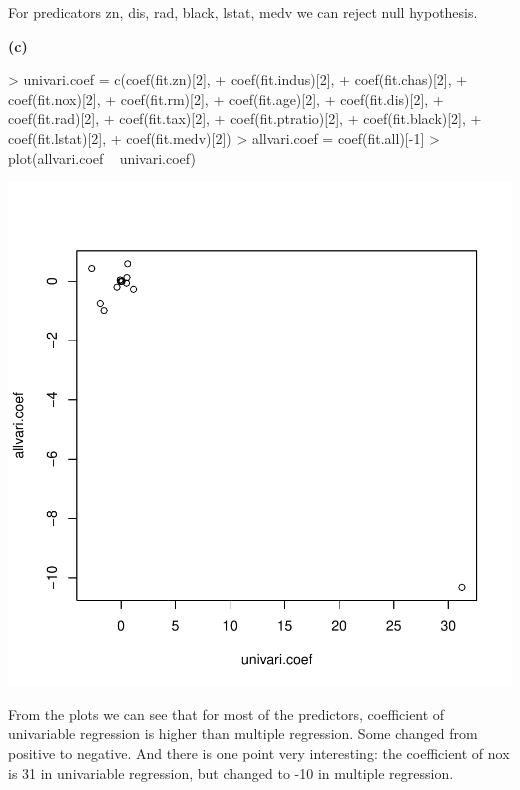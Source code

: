 \documentclass[a4paper]{article}
\renewcommand{\part}[1] {\vspace{.10in} {\bf (#1)}}
\begin{document}
\begin{enumerate}
{\color{red}
\item For predicators zn, dis, rad, black, lstat, medv we can reject null hypothesis.
}
\end{enumerate}

\part{c}
\begin{Schunk}
\begin{Sinput}
> univari.coef = c(coef(fit.zn)[2],
+                  coef(fit.indus)[2],
+                  coef(fit.chas)[2],
+                  coef(fit.nox)[2],
+                  coef(fit.rm)[2],
+                  coef(fit.age)[2],
+                  coef(fit.dis)[2],
+                  coef(fit.rad)[2],
+                  coef(fit.tax)[2],
+                  coef(fit.ptratio)[2],
+                  coef(fit.black)[2],
+                  coef(fit.lstat)[2],
+                  coef(fit.medv)[2])
> allvari.coef = coef(fit.all)[-1]
> plot(allvari.coef ~ univari.coef)
\end{Sinput}
\end{Schunk}
\includegraphics{mutivariblelm-15c}
\begin{enumerate}
{\color{red}
\item From the plots we can see that for most of the predictors, coefficient of univariable regression is higher than multiple regression. Some changed from positive to negative. And there is one point very interesting: the coefficient of nox is 31 in univariable regression, but changed to -10 in multiple regression.
}
\end{enumerate}
\end{document}
